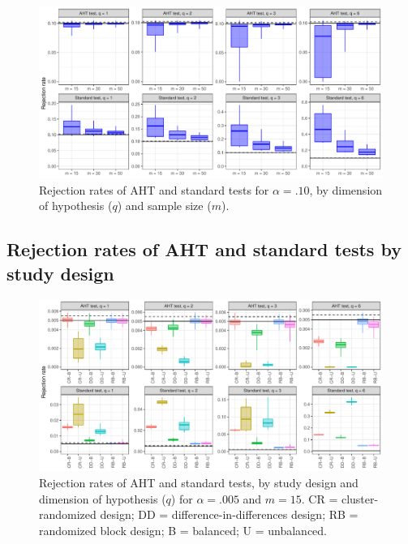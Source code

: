 \documentclass[12pt]{article}
\begin{document}
\begin{landscape}
\begin{figure}[H]
{\centering \includegraphics[width=\linewidth]{CR_fig/overview_10-1} 

}

\caption{Rejection rates of AHT and standard tests for $\alpha = .10$, by dimension of hypothesis ($q$) and sample size ($m$).}\label{fig:overview_10}
\end{figure}

\subsection{Rejection rates of AHT and standard tests by study design}

\begin{figure}[H]

{\centering \includegraphics[width=\linewidth]{CR_fig/balance_005_15-1} 

}

\caption{Rejection rates of AHT and standard tests, by study design and dimension of hypothesis ($q$) for $\alpha = .005$ and $m = 15$. CR = cluster-randomized design; DD = difference-in-differences design; RB = randomized block design; B = balanced; U = unbalanced.}\label{fig:balance_005_15}
\end{figure}


\end{landscape}
\end{document}
